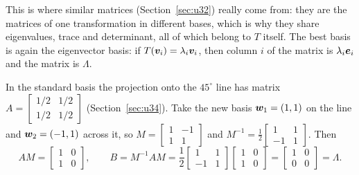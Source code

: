 This is where similar matrices (Section~\ref{sec:u32}) really come from: they are the matrices of
one transformation in different bases, which is why they share eigenvalues, trace and
determinant, all of which belong to $T$ itself. The best basis is again the eigenvector basis:
if $T(\boldsymbol{v}_i)=\lambda_i\boldsymbol{v}_i$, then column $i$ of the matrix is $\lambda_i\boldsymbol{e}_i$ and the matrix is $\Lambda$.

\begin{example}\label{ex:u35-projection}
In the standard basis the projection onto the $45^\circ$ line has matrix
$A=\left[\begin{smallmatrix}1/2&1/2\\1/2&1/2\end{smallmatrix}\right]$ (Section~\ref{sec:u34}). Take the new basis
$\boldsymbol{w}_1=(1,1)$ on the line and $\boldsymbol{w}_2=(-1,1)$ across it, so $M=\left[\begin{smallmatrix}1&-1\\1&1\end{smallmatrix}\right]$ and
$M^{-1}=\tfrac12\left[\begin{smallmatrix}1&1\\-1&1\end{smallmatrix}\right]$. Then
\[
  AM=\begin{bmatrix}1&0\\1&0\end{bmatrix},\qquad
  B=M^{-1}AM=\frac12\begin{bmatrix}1&1\\-1&1\end{bmatrix}\begin{bmatrix}1&0\\1&0\end{bmatrix}=\begin{bmatrix}1&0\\0&0\end{bmatrix}=\Lambda .
\]
\end{example}

